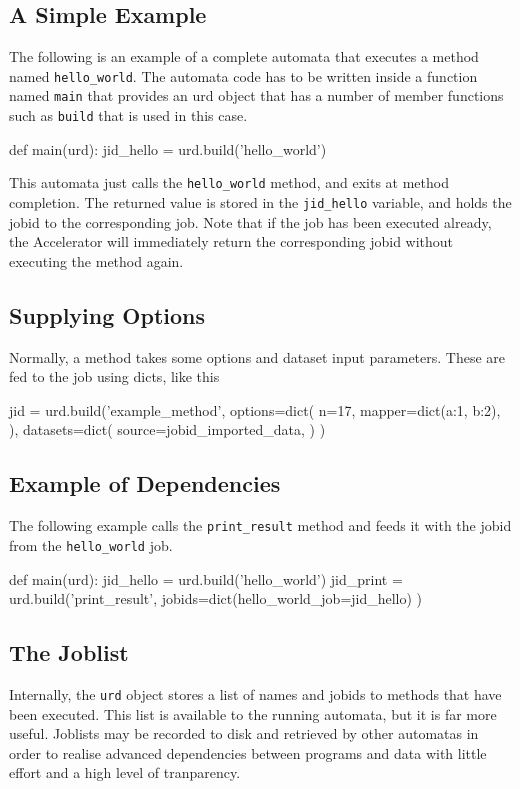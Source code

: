 \documentclass[a4paper]{article}
\begin{document}
\subsection{A Simple Example}
The following is an example of a complete automata that executes a
method named \texttt{hello\_world}.  The automata code has to be
written inside a function named \texttt{main} that provides an urd
object that has a number of member functions such as \texttt{build}
that is used in this case.
\begin{python}
def main(urd):
  jid_hello = urd.build('hello_world')
\end{python}
This automata just calls the \texttt{hello\_world} method, and exits
at method completion.  The returned value is stored in the
\texttt{jid\_hello} variable, and holds the jobid to the corresponding
job.  Note that if the job has been executed already, the Accelerator
will immediately return the corresponding jobid without executing the
method again.

\subsection{Supplying Options}
Normally, a method takes some options and dataset input parameters.
These are fed to the job using dicts, like this
\begin{python}
  jid = urd.build('example_method',
    options=dict(
      n=17,
      mapper=dict(a:1, b:2),
    ),
    datasets=dict(
      source=jobid_imported_data,
    )
  )  
\end{python}

\clearpage

\subsection{Example of Dependencies}
The following example calls the \texttt{print\_result} method and
feeds it with the jobid from the \texttt{hello\_world} job.
\begin{python}
def main(urd):
  jid_hello = urd.build('hello_world')
  jid_print = urd.build('print_result',
    jobids=dict(hello_world_job=jid_hello)
  )
\end{python}

\clearpage



\subsection{The Joblist}
Internally, the \texttt{urd} object stores a list of names and jobids
to methods that have been executed.  This list is available to the
running automata, but it is far more useful.  Joblists may be recorded
to disk and retrieved by other automatas in order to realise advanced
dependencies between programs and data with little effort and a high
level of tranparency.
\end{document}
